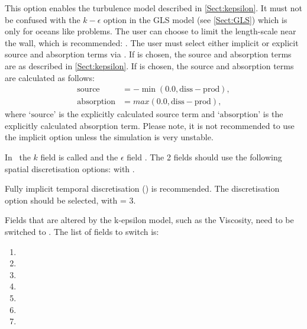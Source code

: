 This option enables the turbulence model described in \ref{Sect:kepsilon}. It must not be confused with the
$k-\epsilon$ option in the GLS model (see \ref{Sect:GLS}) which is only for oceans like problems. The user can choose to limit the length-scale
 near the wall, which is recommended: .
The user must select either implicit or explicit source and absorption terms via .
If  is chosen, the source and absorption terms are as described in \ref{Sect:kepsilon}.
If  is chosen, the source and absorption terms are calculated as follows:
\begin{align*}
\textrm{source} &= -\min(0.0, \textrm{diss}-\textrm{prod}), \\
\textrm{absorption} &= max(0.0, \textrm{diss}-\textrm{prod}), 
\end{align*}
where `$\textrm{source}$' is the explicitly calculated source term and `$\textrm{absorption}$' is the explicitly calculated absorption term. 
Please note, it is not recommended to use the implicit option unless the simulation is very unstable.

In \fluidity\ the $k$ field is called  and the $\epsilon$ field .
The 2 fields should use the following spatial discretisation options: \linebreak
{}
with .

Fully implicit temporal discretisation () \linebreak
is recommended. The  discretisation option should be selected, with \linebreak
{} = 3.

Fields that are altered by the k-epsilon model, such as the Viscosity, need to be switched
to \linebreak {}. The list of fields to switch is:
\begin{enumerate}
\item {}
\item {}
\item {}
\item {}
\item {}
\item {}
\item {}
\end{enumerate}

